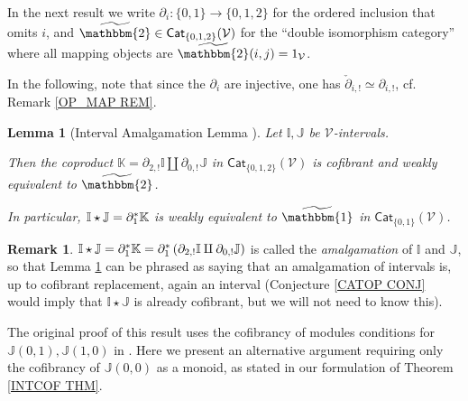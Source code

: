 \documentclass[a4paper,10pt
,draft
]{article}%
\numberwithin{equation}{section}
\numberwithin{figure}{section}
\newtheorem{lemma}[equation]{Lemma}%
\theoremstyle{definition} %
\newtheorem{remark}[equation]{Remark}%
\newcommand{\V}{\ensuremath{\mathcal V}}
\newcommand{\1}{\ensuremath{\mathbbm 1}}%
\begin{document}
In the next result we write 
$\partial_i \colon \{0,1\} \to \{0,1,2\}$
for the ordered inclusion that omits $i$,
and  
$\widetilde{\mathbbm{2}} \in
\mathsf{Cat}_{\{0,1,2\}}(\V)$
for the ``double isomorphism category''
where all mapping objects are $\widetilde{\mathbbm{2}}(i,j)=1_{\V}$.


In the following, note that since the $\partial_i$
are injective, one has 
$\check{\partial}_{i,!} \simeq \partial_{i,!}$,
cf. Remark \ref{OP_MAP REM}.

\begin{lemma}[Interval Amalgamation Lemma {\cite[Lemma 1.16]{BM13}}]
\label{AMALGLEM LEM}
Let $\mathbb{I},\mathbb{J}$ be $\V$-intervals.

Then the coproduct 
$\mathbb{K} = \partial_{2,!} \mathbb{I} \amalg \partial_{0,!} \mathbb{J}$
in $\mathsf{Cat}_{\{0,1,2\}}(\V)$
is cofibrant and weakly equivalent to $\widetilde{\mathbbm{2}}$.

In particular, 
$\mathbb{I} \star \mathbb{J} = \partial_1^{\**}\mathbb{K}$
is weakly equivalent to $\widetilde{\mathbbm{1}}$
in $\mathsf{Cat}_{\{0,1\}}(\V)$.
\end{lemma}


\begin{remark}
$\mathbb{I} \star \mathbb{J} = 
\partial_1^{\**} \mathbb{K} =
\partial_1^{\**} \left(\partial_{2,!} \mathbb{I} \amalg \partial_{0,!} \mathbb{J}\right)$
is called the \emph{amalgamation} of $\mathbb{I}$ and $\mathbb{J}$,
so that Lemma \ref{AMALGLEM LEM} can be phrased as saying that an amalgamation of intervals is,
up to cofibrant replacement, again an interval
(Conjecture \ref{CATOP CONJ} would imply that $\mathbb{I} \star \mathbb{J}$ is already cofibrant, 
but we will not need to know this).
\end{remark}


The original proof of this result \cite[Lemma 1.16]{BM13} uses the cofibrancy of modules conditions for
$\mathbb{J}(0,1),\mathbb{J}(1,0)$
in \cite[Thm 1.15]{BM13}.
Here we present an alternative argument requiring only the cofibrancy of $\mathbb{J}(0,0)$ as a monoid,
as stated in our formulation of Theorem \ref{INTCOF THM}.
\end{document}
